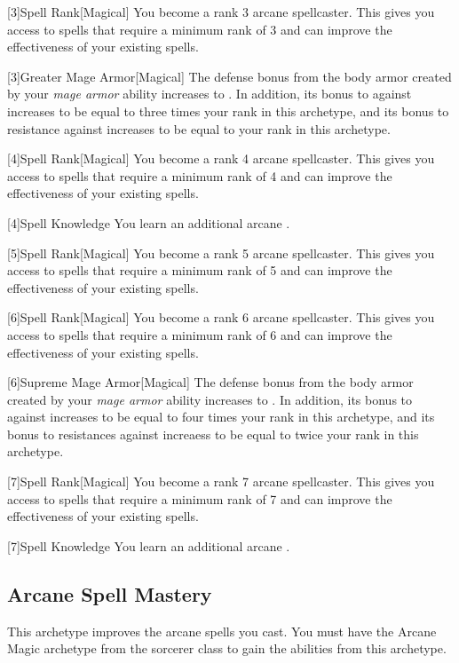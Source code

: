         [3]{Spell Rank}[Magical] You become a rank 3 arcane spellcaster.
        This gives you access to spells that require a minimum rank of 3 and can improve the effectiveness of your existing spells.

        [3]{Greater Mage Armor}[Magical]
        The defense bonus from the body armor created by your \textit{mage armor} ability increases to .
        In addition, its bonus to  against  increases to be equal to three times your rank in this archetype, and its bonus to resistance against  increases to be equal to your rank in this archetype.

        [4]{Spell Rank}[Magical] You become a rank 4 arcane spellcaster.
        This gives you access to spells that require a minimum rank of 4 and can improve the effectiveness of your existing spells.

        [4]{Spell Knowledge} You learn an additional arcane .

        [5]{Spell Rank}[Magical] You become a rank 5 arcane spellcaster.
        This gives you access to spells that require a minimum rank of 5 and can improve the effectiveness of your existing spells.

        [6]{Spell Rank}[Magical] You become a rank 6 arcane spellcaster.
        This gives you access to spells that require a minimum rank of 6 and can improve the effectiveness of your existing spells.

        [6]{Supreme Mage Armor}[Magical]
        The defense bonus from the body armor created by your \textit{mage armor} ability increases to .
        In addition, its bonus to  against  increases to be equal to four times your rank in this archetype, and its bonus to resistances against  increaess to be equal to twice your rank in this archetype.

        [7]{Spell Rank}[Magical] You become a rank 7 arcane spellcaster.
        This gives you access to spells that require a minimum rank of 7 and can improve the effectiveness of your existing spells.

        [7]{Spell Knowledge} You learn an additional arcane .

    \newpage
    \subsection{Arcane Spell Mastery}
        This archetype improves the arcane spells you cast.
        You must have the Arcane Magic archetype from the sorcerer class to gain the abilities from this archetype.

